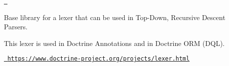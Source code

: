 \href{https://github.com/doctrine/lexer/actions}{\texttt{ }}

Base library for a lexer that can be used in Top-\/\+Down, Recursive Descent Parsers.

This lexer is used in Doctrine Annotations and in Doctrine ORM (DQL).

\href{https://www.doctrine-project.org/projects/lexer.html}{\texttt{ https\+://www.\+doctrine-\/project.\+org/projects/lexer.\+html}} 
